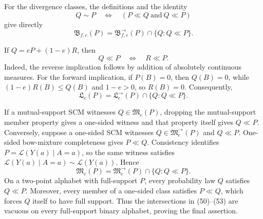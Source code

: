 For the divergence classes, the definitions and the identity
\[
 Q\sim P\quad\Longleftrightarrow\quad(P\ll Q\ \text{and}\ Q\ll P)
\]
give directly
\[
 \mathfrak B_{f,e}(P)
 =\mathfrak B^{\to}_{f,e}(P)\cap\{Q:Q\ll P\}. \tag{50}
\]

If \(Q=eP+(1-e)R\), then
\[
 Q\ll P\quad\Longleftrightarrow\quad R\ll P. \tag{51}
\]
Indeed, the reverse implication follows by addition of absolutely continuous measures.  For the forward implication, if \(P(B)=0\), then \(Q(B)=0\), while \((1-e)R(B)\le Q(B)\) and \(1-e>0\), so \(R(B)=0\).  Consequently,
\[
 \mathfrak L_e(P)
 =\mathfrak L^{\to}_e(P)\cap\{Q:Q\ll P\}. \tag{52}
\]

If a mutual-support SCM witnesses \(Q\in\mathfrak M_e(P)\), dropping the mutual-support member property gives a one-sided witness and that property itself gives \(Q\ll P\).  Conversely, suppose a one-sided SCM witnesses \(Q\in\mathfrak M^{\to}_e(P)\) and \(Q\ll P\).  One-sided bow-mixture completeness gives \(P\ll Q\).  Consistency identifies \(P=\mathcal L(Y(a)\mid A=a)\), so the same witness satisfies \(\mathcal L(Y(a)\mid A=a)\sim\mathcal L(Y(a))\).  Hence
\[
 \mathfrak M_e(P)
 =\mathfrak M^{\to}_e(P)\cap\{Q:Q\ll P\}. \tag{53}
\]
On a two-point alphabet with full-support \(P\), every probability law \(Q\) satisfies \(Q\ll P\).  Moreover, every member of a one-sided class satisfies \(P\ll Q\), which forces \(Q\) itself to have full support.  Thus the intersections in (50)--(53) are vacuous on every full-support binary alphabet, proving the final assertion.